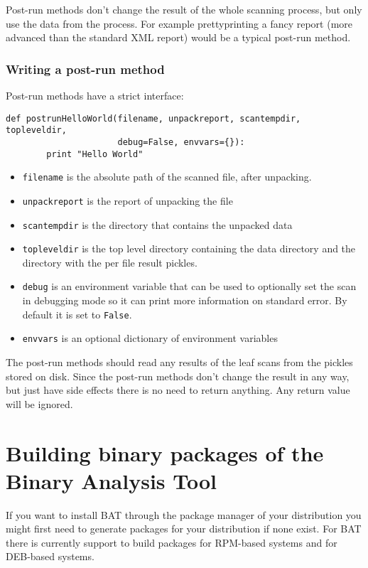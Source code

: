 \documentclass[10pt]{article}
\begin{document}
Post-run methods don't change the result of the whole scanning process, but
only use the data from the process. For example prettyprinting a fancy report
(more advanced than the standard XML report) would be a typical post-run
method.

\subsubsection{Writing a post-run method}

Post-run methods have a strict interface:

\begin{verbatim}
def postrunHelloWorld(filename, unpackreport, scantempdir, topleveldir,
                      debug=False, envvars={}):
        print "Hello World"
\end{verbatim}

\begin{itemize}
\item \texttt{filename} is the absolute path of the scanned file, after
unpacking.
\item \texttt{unpackreport} is the report of unpacking the file
\item \texttt{scantempdir} is the directory that contains the unpacked data
\item \texttt{topleveldir} is the top level directory containing the data
directory and the directory with the per file result pickles.
\item \texttt{debug} is an environment variable that can be used to optionally
set the scan in debugging mode so it can print more information on standard
error. By default it is set to \texttt{False}.
\item \texttt{envvars} is an optional dictionary of environment variables
\end{itemize}

The post-run methods should read any results of the leaf scans from the pickles
stored on disk. Since the post-run methods don't change the result in any way,
but just have side effects there is no need to return anything. Any return value
will be ignored.

\section{Building binary packages of the Binary Analysis Tool}

If you want to install BAT through the package manager of your distribution you
might first need to generate packages for your distribution if none exist. For
BAT there is currently support to build packages for RPM-based systems and for
DEB-based systems.
\end{document}
